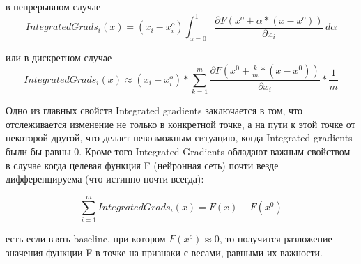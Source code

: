 в непрерывном случае
\begin{equation*}
    IntegratedGrads_i(x) = (x_i - x^o_i) \int_{\alpha=0}^{1}\frac{\partial F(x^o + \alpha*(x - x^o))}{\partial x_i}\, d\alpha
\end{equation*}

или в дискретном случае
\begin{equation*}
    IntegratedGrads_i(x) \approx (x_i - x^o_i) * \sum_{k=1}^{m}\frac{\partial F(x^0 + \frac{k}{m} * (x - x^0))}{\partial x_i} * \frac{1}{m}
\end{equation*}

\noindent\hspace{0.6cm}Одно из главных свойств Integrated gradients заключается в том, что отслеживается изменение не только в конкретной точке, а на пути к этой точке от некоторой другой, что делает невозможным ситуацию, когда Integrated gradients были бы равны 0. Кроме того Integrated Gradients обладают важным свойством в случае когда целевая функция F (нейронная сеть) почти везде
дифференцируема (что истинно почти всегда):

\begin{equation*}
    \sum_{i=1}^{m} IntegratedGrads_i(x) = F(x) - F(x^0)
\end{equation*}

 есть если взять baseline, при котором $F(x^o) \approx 0$, то получится разложение
значения функции F в точке на признаки с весами, равными их важности.